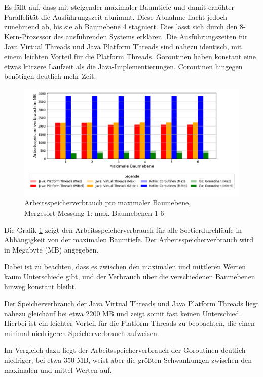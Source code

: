 \documentclass[fontsize=12pt,paper=a4,twoside=semi,parskip=half-,headsepline,headinclude]{scrreprt}
\begin{document}
Es fällt auf, dass mit steigender maximaler Baumtiefe und damit erhöhter Parallelität die Ausführungszeit abnimmt. Diese Abnahme flacht jedoch zunehmend ab, bis sie ab Baumebene 4 stagniert. Dies lässt sich durch den 8-Kern-Prozessor des ausführenden Systems erklären. Die Ausführungszeiten für Java Virtual Threads und Java Platform Threads sind nahezu identisch, mit einem leichten Vorteil für die Platform Threads. Goroutinen haben konstant eine etwas kürzere Laufzeit als die Java-Implementierungen. Coroutinen hingegen benötigen deutlich mehr Zeit.

\begin{figure}[H]
	\centering
	\includegraphics[scale=0.5]{figures/mergesort/Maximalebauebenen1-6/memory_usage_bar_plot.png}
	\caption{Arbeitsspeicherverbrauch pro maximaler Baumebene,\\ Mergesort Messung 1: max. Baumebenen 1-6}
	\label{fig:ms1-6RAM}
\end{figure}

Die Grafik \ref{fig:ms1-6RAM} zeigt den Arbeitsspeicherverbrauch für alle Sortierdurchläufe in Ab\-hän\-gig\-keit von der maximalen Baumtiefe. Der Arbeitsspeicherverbrauch wird in Megabyte (MB) angegeben.

Dabei ist zu beachten, dass es zwischen den maximalen und mittleren Werten kaum Unterschiede gibt, und der Verbrauch über die verschiedenen Baumebenen hinweg konstant bleibt.

Der Speicherverbrauch der Java Virtual Threads und Java Platform Threads liegt nahezu gleichauf bei etwa 2200 MB und zeigt somit fast keinen Unterschied. Hierbei ist ein leichter Vorteil für die Platform Threads zu beobachten, die einen minimal niedrigeren Speicherverbrauch aufweisen.

Im Vergleich dazu liegt der Arbeitsspeicherverbrauch der Goroutinen deutlich niedriger, bei etwa 350 MB, weist aber die größten Schwankungen zwischen den maximalen und mittel Werten auf.
\end{document}
